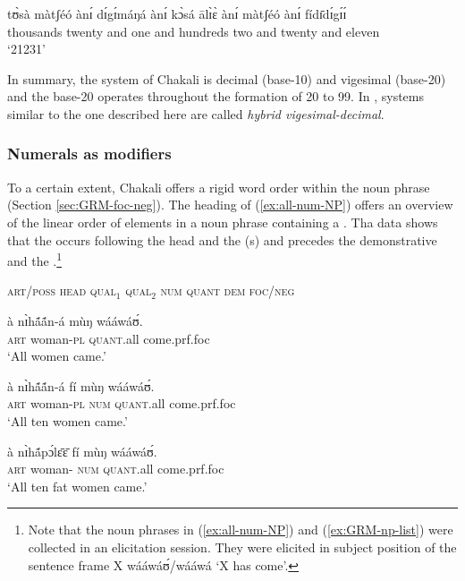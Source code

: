 \begin{exe}
\begin{exe}
\begin{exe}
\begin{exe}
\begin{exe}
\begin{exe}
\begin{exe}
\begin{exe}
\begin{exe}
\begin{exe}
\ex\label{ex:21231}
\gll tʊ̀sà  màtʃéó   ànɪ́  dɪ́gɪ́máŋá ànɪ́  kɔ̀sá  ālɪ̀ɛ̀  ànɪ́ màtʃéó  ànɪ́     fídɪ̄dɪ́gɪ́ɪ́ \\
    {thousands}   {twenty}   {and} {one}  {and}  {hundreds}  {two} {and}   {twenty} {and} {eleven}\\
\glt `21231'


\z
\z
% 

\newpage 
In summary,  the  system of Chakali is decimal (base-10) and vigesimal (base-20) and the base-20  operates throughout the formation of 20 to 99. In \citet{Comr08},  systems similar to the one described here are called \textit{hybrid vigesimal-decimal}.


\subsubsection{Numerals as modifiers}
\label{sec:NUM-npstruc}

To a certain extent, Chakali offers a rigid word order within the noun phrase (Section \ref{sec:GRM-foc-neg}). The heading of (\ref{ex:all-num-NP}) offers an overview of  the linear order of elements in a noun phrase containing a . Tha data shows that the  occurs following the head and the (s) and precedes the demonstrative  and the .\footnote{Note that the noun phrases in  (\ref{ex:all-num-NP}) and  (\ref{ex:GRM-np-list}) were collected in an elicitation session. They were elicited in subject position of the sentence frame {\sls X wááwáʊ́/wááwá} `X has come'.}


\ea\label{ex:all-num-NP}{\rm  \textsc{art/poss}    \textsc{head}    \textsc{qual$_\textrm{1}$}    
\textsc{ qual$_\textrm{2}$}    \textsc {num}   \textsc{quant}      \textsc{dem}      
\textsc{foc/neg}\\}

  \ea\label{ex:all-w}
\gll à nɪ̀hã́ã́n-á mùŋ wááwáʊ́.\\
\textsc{art} {woman-\textsc{pl}} \textsc{quant}.all come.{\sc prf.foc}\\
\glt `All women came.'

 \ex\label{ex:all-ten-w}
\gll à nɪ̀hã́ã́n-á fí mùŋ wááwáʊ́.\\
\textsc{art} {woman-\textsc{pl}} \textsc{num} \textsc{quant}.all come.{\sc prf.foc}\\
\glt `All ten women came.'

\ex\label{ex:all-fat-ten-w}
\gll  à nɪ̀hã́pɔ́lɛ̄ɛ̄ fí mùŋ wááwáʊ́.\\
\textsc{art} {woman-\qual} \textsc{num} \textsc{quant}.all come.{\sc prf.foc}\\
\glt `All ten fat women came.'


\end{exe}
\end{exe}
\end{exe}
\end{exe}
\end{exe}
\end{exe}
\end{exe}
\end{exe}
\end{exe}
\end{exe}
